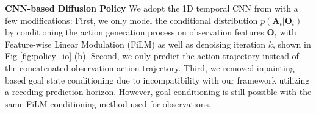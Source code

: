 \documentclass[Afour,sageh,times]{sagej}
\newcommand{\shuran}[1]{\textcolor{MyDarkGreen}{[Shuran: #1]}}
\begin{document}
\textbf{CNN-based Diffusion Policy} 
We adopt the 1D temporal CNN from \citet{pmlr-v162-janner22a} with a few modifications:
%
First, we only model the conditional distribution $p(\mathbf{A}_t|\mathbf{O}_t)$ by conditioning the action generation process on observation features $\mathbf{O}_t$ with Feature-wise Linear Modulation (FiLM) \cite{perez2018film} as well as denoising iteration $k$, shown in Fig \ref{fig:policy_io} (b).
Second, we only predict the action trajectory instead of the concatenated observation action trajectory. 
Third, we removed inpainting-based goal state conditioning due to incompatibility with our framework utilizing a receding prediction horizon. However, goal conditioning is still possible with the same FiLM conditioning method used for observations.
\end{document}
